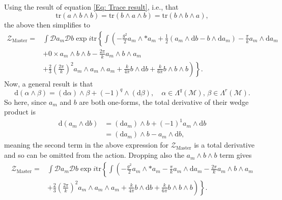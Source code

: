 \documentclass{article}
\begin{document}
Using the result of equation \eqref{Eq: Trace result}, i.e., that
\begin{equation}
    \text{tr}\left(a\wedge b \wedge b\right) = \text{tr}\left(b\wedge a \wedge b\right) = \text{tr}
    \left(b\wedge b \wedge a\right),
\end{equation}
the above then simplifies to 
\begin{align}
    \mathcal{Z}_{\text{Master}}=& \int \mathcal{D}a_{m}\mathcal{D}b\exp i \text{tr}\left\{\int \left(-\frac{g^{2}}{2}a_{m}\wedge * a_{m} + \frac{1}{2}\left( a_{m}\wedge\mathrm{d}b-b\wedge \mathrm{d}a_{m}\right)-\frac{\pi}{k}a_{m}\wedge \mathrm{d}a_{m}
    \right.\right. \nonumber\\
    &+0 \times a_{m}\wedge b\wedge b-\frac{2\pi}{k}a_{m}\wedge b \wedge a_{m}\nonumber\\
    & \left.\left. +\frac{2}{3}\left(\frac{2\pi}{k}\right)^{2}a_{m}\wedge a_{m}\wedge a_{m}+ \frac{k}{4\pi}b\wedge \mathrm{d}b
    +\frac{k}{6\pi}b\wedge b\wedge b   \right)\right\}.
\end{align}
Now, a general result is that
\begin{equation}
    \mathrm{d}\left(\alpha\wedge \beta\right) = \left(\mathrm{d}\alpha\right)\wedge \beta + \left(-1\right)^{q}\wedge \left(\mathrm{d}\beta\right),\quad \alpha\in \Lambda^{q}\left(\mathcal{M}\right),\,\beta\in\Lambda^{r}\left(\mathcal{M}\right).
\end{equation}
So here, since $a_{m}$ and $b$ are both one-forms, the total derivative of their wedge product is
\begin{align}
    \mathrm{d}\left(a_{m}\wedge \mathrm{d}b\right) &= \left(\mathrm{d}a_{m}\right)\wedge b + \left(-1\right)^{1}a_{m}\wedge \mathrm{d}b\\
    &= \left(\mathrm{d}a_{m}\right)\wedge b -a_{m}\wedge \mathrm{d}b,
\end{align}
meaning the second term in the above expression for $\mathcal{Z}_{\text{Master}}$ is a total derivative and so can be omitted from the action. Dropping also the $a_{m}\wedge b \wedge b$ term gives
\begin{align}
    \mathcal{Z}_{\text{Master}}=& \int \mathcal{D}a_{m}\mathcal{D}b\exp i \text{tr}\left\{\int \left(-\frac{g^{2}}{2}a_{m}\wedge * a_{m} -\frac{\pi}{k}a_{m}\wedge \mathrm{d}a_{m}-\frac{2\pi}{k}a_{m}\wedge b \wedge a_{m}
    \right.\right. \nonumber\\
    & \left.\left. +\frac{2}{3}\left(\frac{2\pi}{k}\right)^{2}a_{m}\wedge a_{m}\wedge a_{m}+ \frac{k}{4\pi}b\wedge \mathrm{d}b
    +\frac{k}{6\pi}b\wedge b\wedge b   \right)\right\}.
\end{align}
\end{document}
